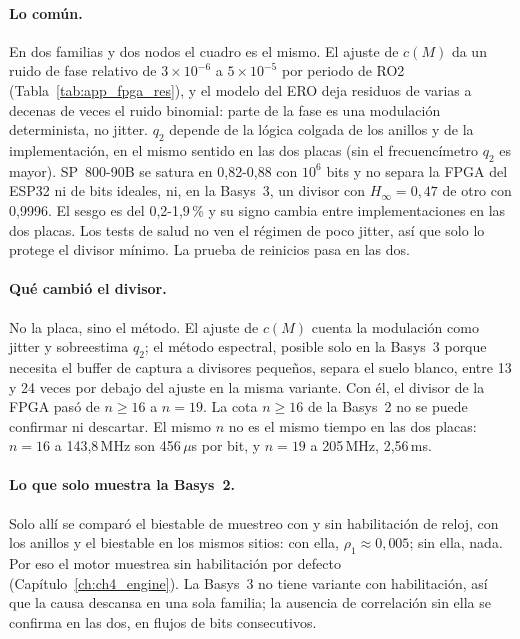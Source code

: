 \paragraph{Lo común.} En dos familias y dos nodos el cuadro es el mismo. El
ajuste de $c(M)$ da un ruido de fase relativo de $3\times10^{-6}$ a $5\times10^{-5}$ por
periodo de RO2 (Tabla~\ref{tab:app_fpga_res}), y el modelo del \ac{ERO} deja residuos de varias a decenas
de veces el ruido binomial: parte de la fase es una modulación
determinista, no jitter. $q_2$ depende de la lógica colgada de los anillos y
de la implementación, en el mismo sentido en las dos placas (sin el
frecuencímetro $q_2$ es mayor). SP~800-90B se satura en 0,82-0,88 con
$10^6$ bits y no separa la \ac{FPGA} del ESP32 ni de bits ideales, ni, en
la Basys~3, un divisor con $H_\infty = 0{,}47$ de otro con 0,9996. El
sesgo es del 0,2-1,9\,\% y su signo cambia entre implementaciones en las
dos placas. Los tests de salud no ven el régimen de poco jitter, así que
solo lo protege el divisor mínimo. La prueba de reinicios pasa en las dos.

\paragraph{Qué cambió el divisor.} No la placa, sino el método. El ajuste
de $c(M)$ cuenta la modulación como jitter y sobreestima $q_2$; el método
espectral, posible solo en la Basys~3 porque necesita el buffer de captura
a divisores pequeños, separa el suelo blanco, entre 13 y 24 veces por
debajo del ajuste en la misma variante. Con él, el divisor de la \ac{FPGA}
pasó de $n \ge 16$ a $n = 19$. La cota $n \ge 16$ de la Basys~2 no se
puede confirmar ni descartar. El mismo $n$ no es el mismo tiempo en las
dos placas: $n = 16$ a 143,8\,MHz son 456\,$\mu$s por bit, y $n = 19$
a 205\,MHz, 2,56\,ms.

\paragraph{Lo que solo muestra la Basys~2.} Solo allí se comparó el
biestable de muestreo con y sin habilitación de reloj, con los anillos y
el biestable en los mismos sitios: con ella, $\rho_1 \approx 0{,}005$; sin
ella, nada. Por eso el motor muestrea sin habilitación por defecto
(Capítulo~\ref{ch:ch4_engine}). La Basys~3 no tiene variante con
habilitación, así que la causa descansa en una sola familia; la ausencia
de correlación sin ella se confirma en las dos, en flujos de bits
consecutivos.

